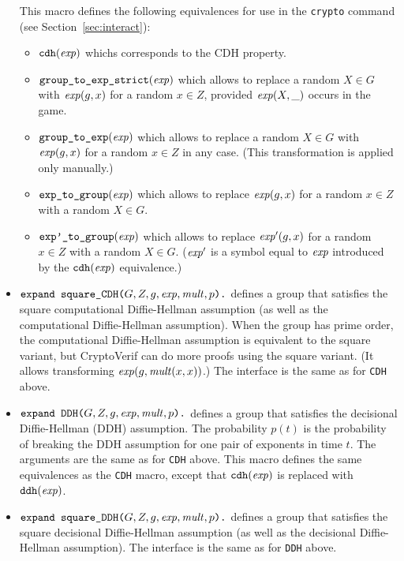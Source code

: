 \documentclass{article}
\begin{document}
\begin{itemize}
   This macro defines the following equivalences for use in the
   \texttt{crypto} command (see Section~\ref{sec:interact}):
\begin{itemize}
\item $\texttt{cdh}(\mathit{exp})$ whichs corresponds to the CDH property.
\item $\texttt{group\_to\_exp\_strict}(\mathit{exp})$ which allows to replace
a random $X \in G$ with $\mathit{exp}(g,x)$ for a random $x \in Z$, provided
$\mathit{exp}(X,\_)$ occurs in the game.
\item $\texttt{group\_to\_exp}(\mathit{exp})$ which allows to replace
a random $X \in G$ with $\mathit{exp}(g,x)$ for a random $x \in Z$ in any case.
(This transformation is applied only manually.)
\item $\texttt{exp\_to\_group}(\mathit{exp})$ which allows to replace
$\mathit{exp}(g,x)$ for a random $x \in Z$ with a random $X \in G$.
\item $\texttt{exp'\_to\_group}(\mathit{exp})$ which allows to replace
$\mathit{exp'}(g,x)$ for a random $x \in Z$ with a random $X \in G$.
($\mathit{exp'}$ is a symbol equal to $\mathit{exp}$ introduced by the
$\texttt{cdh}(\mathit{exp})$ equivalence.)
\end{itemize}

\item $\texttt{expand\ square\_CDH(}G, Z, g, \mathit{exp}, \mathit{mult},
  p\texttt{).}$ defines a group that satisfies the square
  computational Diffie-Hellman assumption (as well as the computational 
  Diffie-Hellman assumption). When the group has prime order,
  the computational Diffie-Hellman assumption is equivalent to the
  square variant, but CryptoVerif can do more proofs using the
  square variant. (It allows transforming $\mathit{exp}(g, \mathit{mult}(x,x))$.)
  The interface is the same as for \texttt{CDH} above.

\item $\texttt{expand\ DDH(}G, Z, g, \mathit{exp}, \mathit{mult},
  p\texttt{).}$ defines a group that satisfies the decisional
  Diffie-Hellman (DDH) assumption. The probability $p(t)$ is the probability of breaking the DDH assumption for one pair of exponents in time $t$. The arguments are the same as for
  \texttt{CDH} above. This macro defines the same equivalences
as the \texttt{CDH} macro, except that $\texttt{cdh}(\mathit{exp})$ is replaced
with $\texttt{ddh}(\mathit{exp})$.

\item $\texttt{expand\ square\_DDH(}G, Z, g, \mathit{exp}, \mathit{mult},
  p\texttt{).}$ defines a group that satisfies the square decisional
  Diffie-Hellman assumption (as well as the decisional
  Diffie-Hellman assumption). The interface is the same as for \texttt{DDH} above.


\end{itemize}
\end{document}

